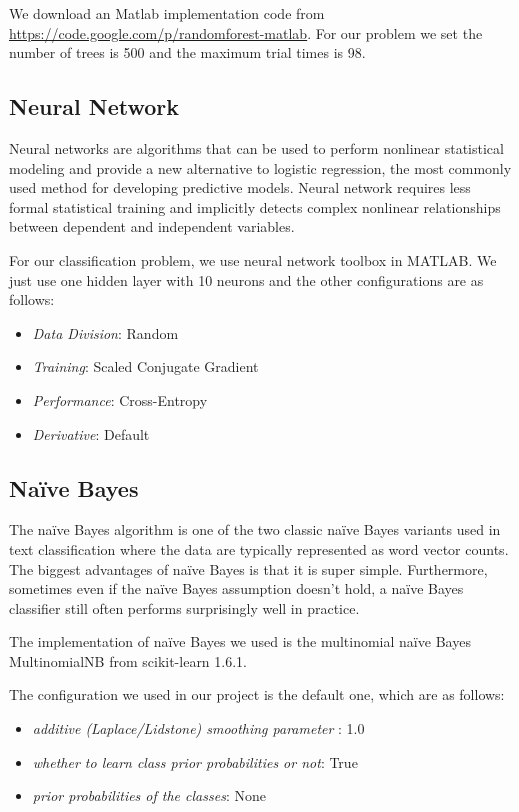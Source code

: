 \documentclass[letterpaper,11pt,twocolumn]{article}
\begin{document}
We download an Matlab implementation code from \url{https://code.google.com/p/randomforest-matlab}. For our problem we set the number of trees is 500 and the maximum trial times is 98.

\subsection{Neural Network}
Neural networks are algorithms that can be used to perform nonlinear statistical modeling and provide a new alternative to logistic regression, the most commonly used method for developing predictive models. Neural network requires less formal statistical training and implicitly detects complex nonlinear relationships between dependent and independent variables.

For our classification problem, we use neural network toolbox in MATLAB. We just use one hidden layer with 10 neurons and the other configurations are as follows:
\begin{itemize}
\item \emph{Data Division}: Random
\item \emph{Training}: Scaled Conjugate Gradient
\item \emph{Performance}: Cross-Entropy
\item \emph{Derivative}: Default
\end{itemize}

\subsection{Na{\"i}ve Bayes}
The na{\"i}ve Bayes algorithm is one of the two classic na{\"i}ve Bayes variants used in text classification where the data are typically represented as word vector counts. The biggest advantages of na{\"i}ve Bayes is that it is super simple. Furthermore, sometimes even if the na{\"i}ve Bayes assumption doesn't hold, a na{\"i}ve Bayes classifier still often performs surprisingly well in practice.

The implementation of na{\"i}ve Bayes we used is the multinomial na{\"i}ve Bayes MultinomialNB from scikit-learn 1.6.1\cite{scikit}.

The configuration we used in our project is the default one, which are as follows:
\begin{itemize}
\item \emph{additive (Laplace/Lidstone) smoothing parameter }: 1.0
\item \emph{whether to learn class prior probabilities or not}: True
\item \emph{prior probabilities of the classes}: None
\end{itemize}
\end{document}

